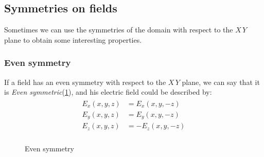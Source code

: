 \subsection*{Symmetries on fields}
Sometimes we can use the symmetries of the domain with respect to the $X\,Y$ plane to obtain some interesting properties.
\subsubsection*{Even symmetry}
If a field has an even symmetry with respect to the $X\,Y$ plane, we can say that it is \emph{Even symmetric}(\cref{fig:even_sym}), and his electric field could be described by:
\begin{align}
    \begin{split}
        E_x(x,y,z)&=E_x(x,y,-z)\\[5pt]
        E_y(x,y,z)&=E_y(x,y,-z)\\[5pt]
        E_z(x,y,z)&=-E_z(x,y,-z)\\[5pt]
    \end{split}
\end{align}
\begin{figure}[H]
    \begin{center}
        \caption{Even symmetry}\label{fig:even_sym} 
    \end{center}
\end{figure}
